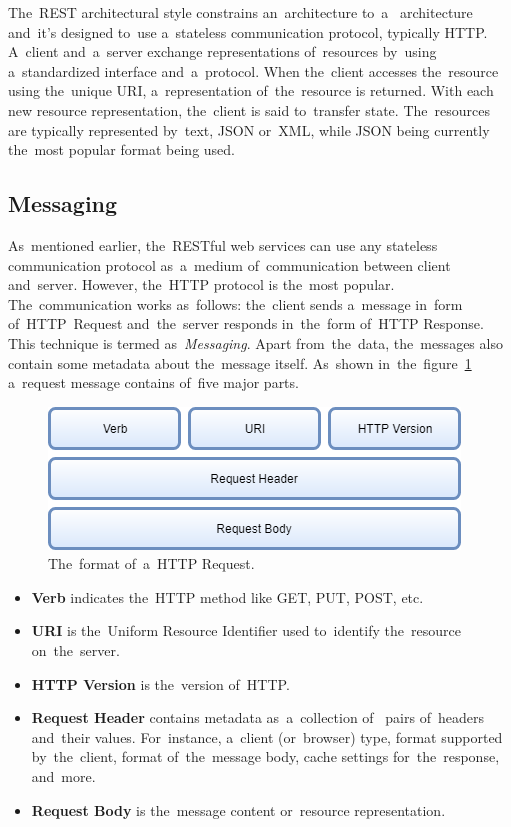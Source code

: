 The~REST architectural style constrains an~architecture to~a~
architecture and~it's designed to~use a~stateless communication protocol,
typically HTTP. A~client and~a~server exchange representations of~resources
by~using a~standardized interface and~a~protocol. When the~client accesses
the~resource using the~unique URI, a~representation of~the~resource is returned.
With each new resource representation, the~client is said to~transfer state.
The~resources are typically represented by~text, JSON or~XML, while JSON being
currently the~most popular format being used.


\subsection{Messaging}
As~mentioned earlier, the~RESTful web services can use any stateless
communication protocol as~a~medium of~communication between client and~server.
However, the~HTTP protocol is the~most popular. The~communication works
as~follows: the~client sends a~message in~form of~HTTP~Request and~the~server
responds in~the~form of~HTTP Response. This technique is termed
as~\textit{Messaging}. Apart from~the~data, the~messages also contain some
metadata about the~message itself. As~shown in~the~figure~\ref{fig-HTTPRequest}
a~request message contains of~five major parts.

\begin{figure}[!hbt]
	\centering
	\includegraphics[scale=0.5]{./figures/http-request.png}
	\caption{The~format of~a~HTTP Request.}
	\label{fig-HTTPRequest}
\end{figure}

\begin{itemize}
  \item \textbf{Verb} indicates the~HTTP method like GET, PUT, POST, etc.
  \item \textbf{URI} is the~Uniform Resource Identifier used to~identify
  the~resource on~the~server.
  \item \textbf{HTTP Version} is the~version of~HTTP.
  \item \textbf{Request Header} contains metadata as~a~collection
  of~ pairs of~headers and~their values. For~instance, a~client
  (or~browser) type, format supported by~the~client, format of~the~message body,
  cache settings for~the~response, and~more.
  \item \textbf{Request Body} is the~message content or~resource representation.
\end{itemize}

